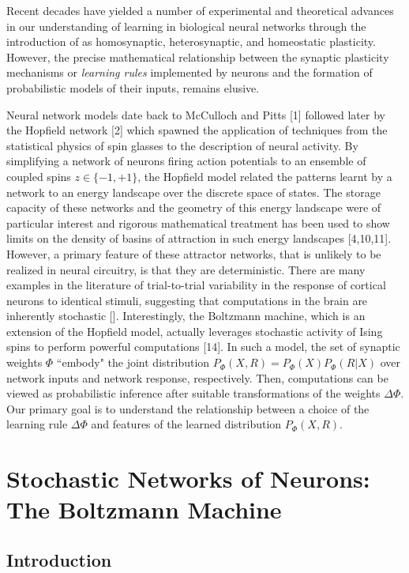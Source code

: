 \documentclass{ucetd}
\begin{document}
Recent decades have yielded a number of experimental and theoretical advances in our understanding of learning in biological neural networks through the introduction of as homosynaptic, heterosynaptic, and homeostatic plasticity. However, the precise mathematical relationship between the synaptic plasticity mechanisms or \emph{learning rules} implemented by neurons and the formation of probabilistic models of their inputs, remains elusive.

Neural network models date back to McCulloch and Pitts [1] followed later by the Hopfield network [2] which spawned the application of techniques from the statistical physics of spin glasses to the description of neural activity. By simplifying a network of neurons firing action potentials to an ensemble of coupled spins $z \in \{-1, +1\}$, the Hopfield model related the patterns learnt by a network to an energy landscape over the discrete space of states. The storage capacity of these networks and the geometry of this energy landscape were of particular interest and rigorous mathematical treatment has been used to show limits on the density of basins of attraction in such energy landscapes [4,10,11]. However, a primary feature of these attractor networks, that is unlikely to be realized in neural circuitry, is that they are deterministic. There are many examples in the literature of trial-to-trial variability in the response of cortical neurons to identical stimuli, suggesting that computations in the brain are inherently stochastic []. Interestingly, the Boltzmann machine, which is an extension of the Hopfield model, actually leverages stochastic activity of Ising spins to perform powerful computations [14]. In such a model, the set of synaptic weights $\Phi$ ``embody" the joint distribution $P_{\Phi}(X,R) = P_{\Phi}(X)P_{\Phi}(R|X)$ over network inputs and network response, respectively. Then, computations can be viewed as probabilistic inference after suitable transformations of the weights $\Delta\Phi$. Our primary goal is to understand the relationship between a choice of the learning rule $\Delta \Phi$ and features of the learned distribution $P_{\Phi}(X,R)$.


\chapter{Stochastic Networks of Neurons: The Boltzmann Machine}
\section{Introduction}
\end{document}
